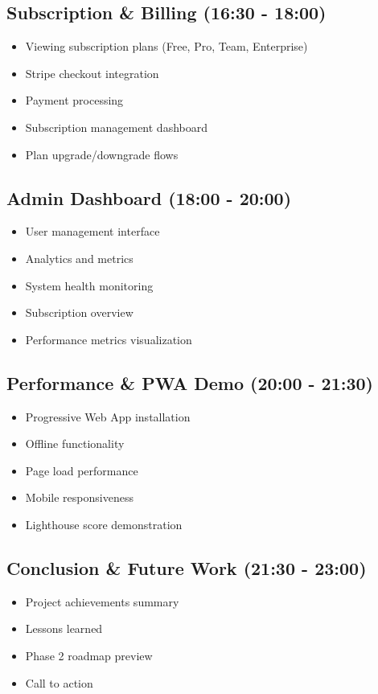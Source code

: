 \subsection{Subscription \& Billing (16:30 - 18:00)}
\begin{itemize}[leftmargin=*]
    \item Viewing subscription plans (Free, Pro, Team, Enterprise)
    \item Stripe checkout integration
    \item Payment processing
    \item Subscription management dashboard
    \item Plan upgrade/downgrade flows
\end{itemize}

\subsection{Admin Dashboard (18:00 - 20:00)}
\begin{itemize}[leftmargin=*]
    \item User management interface
    \item Analytics and metrics
    \item System health monitoring
    \item Subscription overview
    \item Performance metrics visualization
\end{itemize}

\subsection{Performance \& PWA Demo (20:00 - 21:30)}
\begin{itemize}[leftmargin=*]
    \item Progressive Web App installation
    \item Offline functionality
    \item Page load performance
    \item Mobile responsiveness
    \item Lighthouse score demonstration
\end{itemize}

\subsection{Conclusion \& Future Work (21:30 - 23:00)}
\begin{itemize}[leftmargin=*]
    \item Project achievements summary
    \item Lessons learned
    \item Phase 2 roadmap preview
    \item Call to action
\end{itemize}

